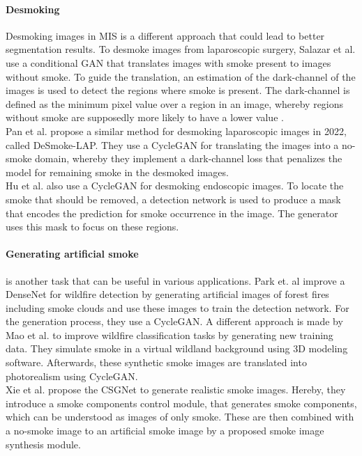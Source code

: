 \paragraph*{Desmoking} Desmoking images in MIS is a different approach that could lead to better segmentation results.
To desmoke images from laparoscopic surgery, Salazar et al. \cite{salazar2020desmoking} use a conditional GAN that translates images with smoke present to images without smoke.
To guide the translation, an estimation of the dark-channel of the images is used to detect the regions where smoke is present.
The dark-channel is defined as the minimum pixel value over a region in an image, whereby regions without smoke are supposedly more likely to have a lower value \cite{salazar2020desmoking}.\\
Pan et al. \cite{pan2022desmoke} propose a similar method for desmoking laparoscopic images in 2022, called DeSmoke-LAP.
They use a CycleGAN for translating the images into a no-smoke domain, whereby they implement a dark-channel loss that penalizes the model for remaining smoke in the desmoked images.\\
Hu et al. \cite{hu2021cycle} also use a CycleGAN for desmoking endoscopic images. 
To locate the smoke that should be removed, a detection network is used to produce a mask that encodes the prediction for smoke occurrence in the image.
The generator uses this mask to focus on these regions.\\

\paragraph*{Generating artificial smoke} is another task that can be useful in various applications.
Park et. al \cite{park2020wildfire} improve a DenseNet for wildfire detection by generating artificial images of forest fires including smoke clouds and use these images to train the detection network.
For the generation process, they use a CycleGAN.
A different approach is made by Mao et al. \cite{mao2021wildfire} to improve wildfire classification tasks by generating new training data. 
They simulate smoke in a virtual wildland background using 3D modeling software.
Afterwards, these synthetic smoke images are translated into photorealism using CycleGAN.\\
Xie et al. \cite{xie2020generating} propose the CSGNet to generate realistic smoke images.
Hereby, they introduce a smoke components control module, that generates smoke components, which can be understood as images of only smoke.
These are then combined with a no-smoke image to an artificial smoke image by a proposed smoke image synthesis module.\\

